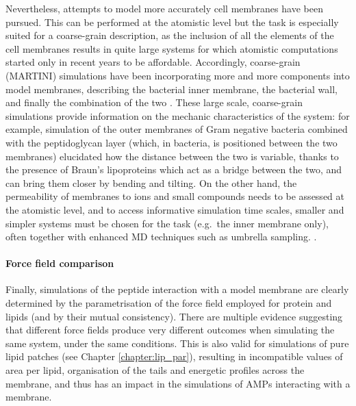 Nevertheless, attempts to model more accurately cell membranes have been pursued. This can be performed at the atomistic level \cite{Piggot2011}
but the task is especially suited for a coarse-grain description, as the inclusion of all the elements of the cell membranes results in quite large systems for which atomistic computations started only in recent years to be affordable.
%
Accordingly, coarse-grain (MARTINI) simulations have been incorporating more and more components into model membranes, describing the bacterial inner membrane, the bacterial wall, and finally the combination of the two \cite{Khalid2019}.
%
These large scale, coarse-grain simulations provide information on the mechanic characteristics of the system: for example, simulation of the outer membranes of Gram negative bacteria combined with the peptidoglycan layer (which, in bacteria, is positioned between the two membranes) elucidated how the distance between the two is variable, thanks to the presence of Braun's lipoproteins \cite{Asmar2018} which act as a bridge between the two, and can bring them closer by bending and tilting.
%
On the other hand, the permeability of membranes to ions and small compounds needs to be assessed at the atomistic level, and to access informative simulation time scales, smaller and simpler systems must be chosen for the task (e.g.\ the inner membrane only), often together with enhanced MD techniques such as umbrella sampling. \cite{Piggot2011,Carpenter2016}.



\paragraph{Force field comparison} Finally, simulations of the peptide interaction with a model membrane are clearly determined by the parametrisation of the force field employed for protein and lipids (and by their mutual consistency).
%
There are multiple evidence suggesting that different force fields produce very different outcomes when simulating the same system, under the same conditions. This is also valid for simulations of pure lipid patches (see Chapter \ref{chapter:lip_par}), resulting in incompatible values of area per lipid, organisation of the tails and energetic profiles across the membrane, and thus has an impact in the simulations of AMPs interacting with a membrane.

